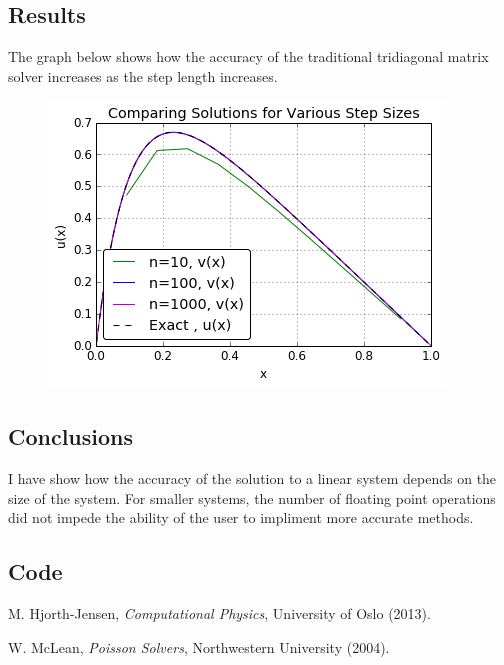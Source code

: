 \documentclass[11pt]{article}
\begin{document}
    

\subsection{Results}

    The graph below shows how the accuracy of the traditional tridiagonal matrix solver increases as the step length increases.

    \begin{figure}[h!] \begin{center}
    \includegraphics[width=.6\textwidth]{setpsizechange.png}
    \end{center}  \end{figure}

\pagebreak
\subsection{Conclusions}

    I have show how the accuracy of the solution to a linear system depends on the size of the system. For smaller systems, the number of floating point operations did not impede the ability of the user to impliment more accurate methods.

\subsection{Code}

    

    

\begin{thebibliography}{1}

     M. Hjorth-Jensen, {\em Computational Physics}, University of Oslo (2013).

     W. McLean, {\em Poisson Solvers}, Northwestern University (2004).

\end{thebibliography}
\end{document}
